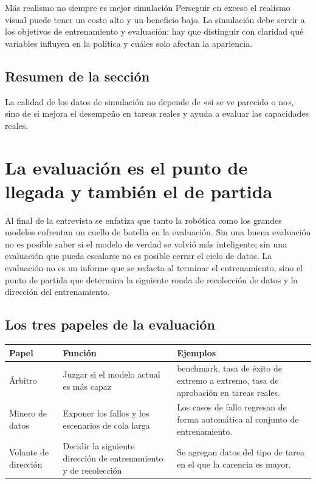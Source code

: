 \documentclass[a4paper]{article}
\begin{document}
\begin{warningbox}{Más realismo no siempre es mejor simulación}
Perseguir en exceso el realismo visual puede tener un costo alto y un beneficio bajo. La simulación debe servir a los objetivos de entrenamiento y evaluación: hay que distinguir con claridad qué variables influyen en la política y cuáles solo afectan la apariencia.
\end{warningbox}

\subsection{Resumen de la sección}

La calidad de los datos de simulación no depende de «si se ve parecido o no», sino de si mejora el desempeño en tareas reales y ayuda a evaluar las capacidades reales.
\section{La evaluación es el punto de llegada y también el de partida}

Al final de la entrevista se enfatiza que tanto la robótica como los grandes modelos enfrentan un cuello de botella en la evaluación. Sin una buena evaluación no es posible saber si el modelo de verdad se volvió más inteligente; sin una evaluación que pueda escalarse no es posible cerrar el ciclo de datos. La evaluación no es un informe que se redacta al terminar el entrenamiento, sino el punto de partida que determina la siguiente ronda de recolección de datos y la dirección del entrenamiento.

\subsection{Los tres papeles de la evaluación}

\noindent\begin{longtable}{p{}p{}p{}}
\toprule
Papel & Función & Ejemplos \\
\midrule
Árbitro & Juzgar si el modelo actual es más capaz & benchmark, tasa de éxito de extremo a extremo, tasa de aprobación en tareas reales. \\
Minero de datos & Exponer los fallos y los escenarios de cola larga & Los casos de fallo regresan de forma automática al conjunto de entrenamiento. \\
Volante de dirección & Decidir la siguiente dirección de entrenamiento y de recolección & Se agregan datos del tipo de tarea en el que la carencia es mayor. \\
\bottomrule
\end{longtable}
\end{document}

